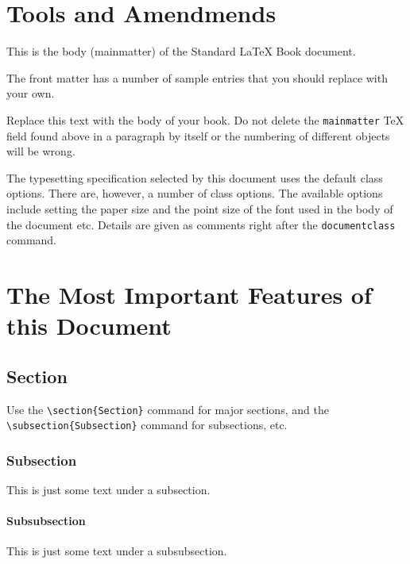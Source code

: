 \documentclass[a4paper]{book}%
\begin{document}
\chapter{Tools and Amendmends}

This is the body (mainmatter) of the Standard LaTeX Book document.

The front matter has a number of sample entries that you should
replace with your own.

Replace this text with the body of your book. Do not delete the
\verb|mainmatter| TeX field found above in a paragraph by itself
or the numbering of different objects will be wrong.

The typesetting specification selected by this document uses the
default class options. There are, however, a number of class
options. The available options include setting the paper size and
the point size of the font used in the body of the document etc.
Details are given as comments right after the \verb|documentclass|
command.

\chapter{The Most Important Features of this Document}

\section{Section}

Use the \verb"\section{Section}" command for major sections, and the
\verb"\subsection{Subsection}" command for subsections, etc.

\subsection{Subsection}

This is just some text under a subsection.

\subsubsection{Subsubsection}

This is just some text under a subsubsection.
\end{document}
